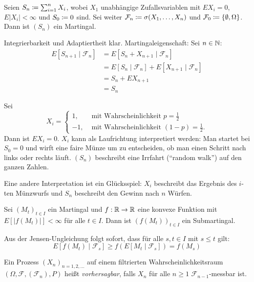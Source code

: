 \documentclass[a4paper,twoside,DIV15,BCOR12mm]{scrbook}
\newcommand{\cF}{\mathcal F}
\begin{document}
\begin{beispiel}
Seien $S_n \da \sum_{i=1}^n X_i$, wobei $X_1$ unabhängige Zufallsvariablen mit $EX_i=0$, $E|X_i|<\infty$ und $S_0\da 0$ sind. Sei weiter $\cF_n\da \sigma(X_1,\ldots,X_n)$ und $\cF_0 \da \{\emptyset, \Omega\}$. Dann ist $(S_n)$ ein Martingal.
\end{beispiel}
\begin{beweis}
Integrierbarkeit und Adaptiertheit klar. Martingaleigenschaft: Sei $n\in\mathbb{N}$:
\begin{align*}
E[S_{n+1}\mid \cF_n] &= E[S_n + X_{n+1}\mid \cF_n] \\
&= E[S_n\mid \cF_n] + E[X_{n+1}\mid \cF_n] \\
&= S_n + EX_{n+1} \\
&= S_n
\end{align*}
\end{beweis}

Sei 
\[
X_i = 
\begin{cases}
1, & \text{ mit Wahrscheinlichkeit $p=\frac 12$} \\
-1,& \text{ mit Wahrscheinlichkeit $(1-p)=\frac 12$.}
\end{cases}
\]
Dann ist $EX_i = 0$. $X_i$ kann als Laufrichtung interpretiert werden: Man startet bei $S_0=0$ und wirft eine faire Münze um zu entscheiden, ob man einen Schritt nach links oder rechts läuft. $(S_n)$ beschreibt eine Irrfahrt (“random walk”) auf den ganzen Zahlen.

Eine andere Interpretation ist ein Glücksspiel: $X_i$ beschreibt das Ergebnis des $i$-ten Münzwurfs und $S_n$ beschreibt den Gewinn nach $n$ Würfen.

\begin{satz}
Sei $(M_t)_{t\in I}$ ein Martingal und $f:\mathbb{R} \to\mathbb{R}$ eine konvexe Funktion mit $E[|f(M_t)|]<\infty$ für alle $t\in I$. Dann ist $(f(M_t))_{t\in I}$ ein Submartingal.
\end{satz}

\begin{beweis}
Aus der Jensen-Ungleichung folgt sofort, dass für alle $s,t\in I$ mit $s\le t$ gilt:
\[
E[f(M_t)\mid \cF_s] \ge f(E[M_t\mid \cF_s]) = f(M_s)
\]
\end{beweis}

\begin{definition}
Ein Prozess $(X_n)_{n=1,2,\ldots}$ auf einem filtrierten Wahrscheinlichkeitsraum $(\Omega, \cF, (\cF_n), P)$ heißt \emph{vorhersagbar},  falls $X_n$ für alle $n\ge 1$ $\cF_{n-1}$-messbar ist.
\end{definition}
\end{document}
